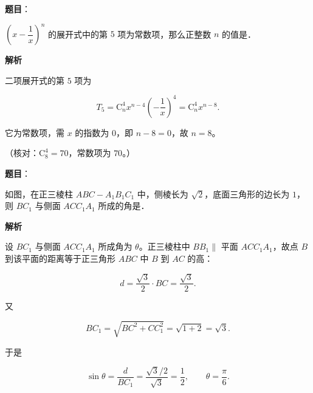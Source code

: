 \begin{answer}

\textbf{题目}：

$\left(x-\dfrac1x\right)^n$ 的展开式中的第 $5$ 项为常数项，那么正整数 $n$ 的值是\gkblank{}．

\textbf{解析}

二项展开式的第 $5$ 项为

\nopagebreak[4]
\[T_5=\mathrm C_n^4x^{n-4}\left(-\frac1x\right)^4=\mathrm C_n^4x^{n-8}.\]

它为常数项，需 $x$ 的指数为 $0$，即 $n-8=0$，故 $n=8$。

（核对：$\mathrm C_8^4=70$，常数项为 $70$。）


\end{answer}
\begin{answer}

\textbf{题目}：

如图，在正三棱柱 $ABC-A_1B_1C_1$ 中，侧棱长为 $\sqrt2$，底面三角形的边长为 $1$，则 $BC_1$ 与侧面 $ACC_1A_1$ 所成的角是\gkblank{}．
\nopagebreak[4]
\begin{center}\end{center}
\nopagebreak[4]
\textbf{解析}

设 $BC_1$ 与侧面 $ACC_1A_1$ 所成角为 $\theta$。正三棱柱中 $BB_1\parallel$ 平面 $ACC_1A_1$，故点 $B$ 到该平面的距离等于正三角形 $ABC$ 中 $B$ 到 $AC$ 的高：

\nopagebreak[4]
\[d=\frac{\sqrt3}{2}\cdot BC=\frac{\sqrt3}{2}.\]

又

\nopagebreak[4]
\[BC_1=\sqrt{BC^2+CC_1^2}=\sqrt{1+2}=\sqrt3 .\]

于是

\nopagebreak[4]
\[\sin\theta=\frac{d}{BC_1}=\frac{\sqrt3/2}{\sqrt3}=\frac12,\qquad \theta=\frac{\pi}{6}.\]


\end{answer}
